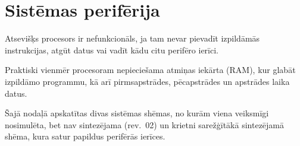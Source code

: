 \section{Sistēmas perifērija}
	Atsevišķs procesors ir nefunkcionāls, ja tam nevar pievadīt izpildāmās
	instrukcijas, atgūt datus vai vadīt kādu citu perifēro ierīci.
	
	Praktiski vienmēr procesoram nepieciešama atmiņas iekārta (RAM), kur
	glabāt izpildāmo programmu, kā arī pirmsapstrādes, pēcapstrādes un 
	apstrādes laika datus.
	
	Šajā nodaļā apskatītas divas sistēmas shēmas, no kurām viena veiksmīgi
	nosimulēta, bet nav sintezējama (rev.~02) un krietni sarežģītākā
	sintezējamā shēma, kura satur papildus perifērās ierīces.
	
	 \clearpage %
	 \clearpage %
	
